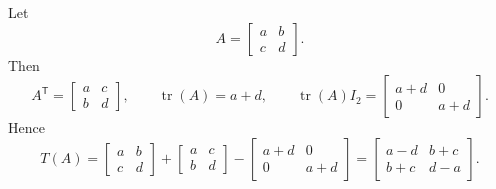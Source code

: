 \documentclass[12pt]{article}
\begin{document}
Let
\[
A=\begin{bmatrix}a&b\\c&d\end{bmatrix}.
\]
Then
\[
A^{\mathsf T}=\begin{bmatrix}a&c\\b&d\end{bmatrix},
\qquad
\operatorname{tr}(A)=a+d,
\qquad
\operatorname{tr}(A)I_2=
\begin{bmatrix}a+d&0\\0&a+d\end{bmatrix}.
\]
Hence
\[
T(A)
=
\begin{bmatrix}a&b\\c&d\end{bmatrix}
+
\begin{bmatrix}a&c\\b&d\end{bmatrix}
-
\begin{bmatrix}a+d&0\\0&a+d\end{bmatrix}
=
\begin{bmatrix}
a-d & b+c\\
b+c & d-a
\end{bmatrix}.
\]
\end{document}
